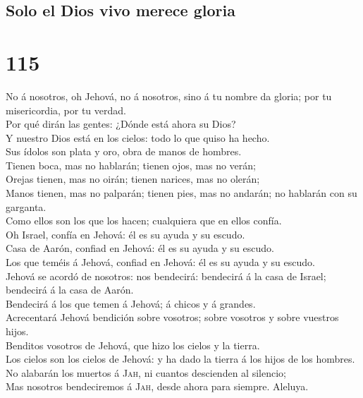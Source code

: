 \hypertarget{solo-el-dios-vivo-merece-gloria}{%
\subsection{Solo el Dios vivo merece
gloria}\label{solo-el-dios-vivo-merece-gloria}}

\hypertarget{section-114}{%
\section{115}\label{section-114}}

 No á nosotros, oh Jehová, no á nosotros, sino á tu nombre
da gloria; por tu misericordia, por tu verdad.\\
 Por qué dirán las gentes: ¿Dónde está ahora su Dios?\\
 Y nuestro Dios está en los cielos: todo lo que quiso ha
hecho.\\
 Sus ídolos son plata y oro, obra de manos de hombres.\\
 Tienen boca, mas no hablarán; tienen ojos, mas no
verán;\\
 Orejas tienen, mas no oirán; tienen narices, mas no
olerán;\\
 Manos tienen, mas no palparán; tienen pies, mas no
andarán; no hablarán con su garganta.\\
 Como ellos son los que los hacen; cualquiera que en ellos
confía.\\
 Oh Israel, confía en Jehová: él es su ayuda y su
escudo.\\
 Casa de Aarón, confiad en Jehová: él es su ayuda y su
escudo.\\
 Los que teméis á Jehová, confiad en Jehová: él es su
ayuda y su escudo.\\
 Jehová se acordó de nosotros: nos bendecirá: bendecirá á
la casa de Israel; bendecirá á la casa de Aarón.\\
 Bendecirá á los que temen á Jehová; á chicos y á
grandes.\\
 Acrecentará Jehová bendición sobre vosotros; sobre
vosotros y sobre vuestros hijos.\\
 Benditos vosotros de Jehová, que hizo los cielos y la
tierra.\\
 Los cielos son los cielos de Jehová: y ha dado la tierra
á los hijos de los hombres.\\
 No alabarán los muertos á \textsc{Jah}, ni cuantos
descienden al silencio;\\
 Mas nosotros bendeciremos á \textsc{Jah}, desde ahora
para siempre. Aleluya.

